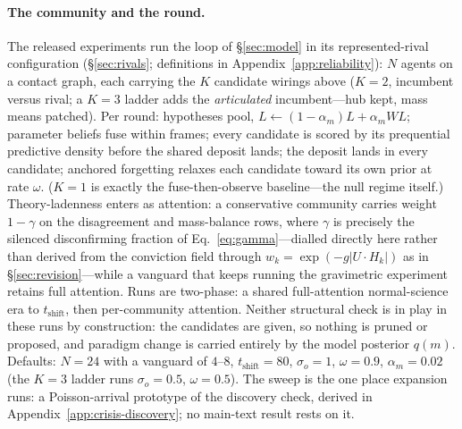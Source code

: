 \documentclass[runningheads]{llncs}
\begin{document}
\paragraph{The community and the round.}
The released experiments run the loop of \S\ref{sec:model} in its represented-rival
configuration (\S\ref{sec:rivals}; definitions in Appendix~\ref{app:reliability}): $N$
agents on a contact graph, each carrying the $K$ candidate wirings above ($K{=}2$,
incumbent versus rival; a $K{=}3$ ladder adds the \emph{articulated} incumbent---hub kept,
mass means patched). Per round: hypotheses pool,
$L\leftarrow(1-\alpha_m)L+\alpha_m WL$; parameter beliefs fuse within frames; every
candidate is scored by its prequential predictive density before the shared deposit lands;
the deposit lands in every candidate; anchored forgetting relaxes each candidate toward its
own prior at rate $\omega$. ($K{=}1$ is exactly the fuse-then-observe baseline---the null
regime itself.) Theory-ladenness enters as attention: a conservative community carries
weight $1-\gamma$ on the disagreement and mass-balance rows, where $\gamma$ is precisely
the silenced disconfirming fraction of Eq.~\eqref{eq:gamma}---dialled directly here rather
than derived from the conviction field through $w_k=\exp(-g|U\!\cdot\!H_k|)$ as in
\S\ref{sec:revision}---while a vanguard that keeps running the gravimetric experiment
retains full attention. Runs are two-phase: a shared full-attention normal-science era to
$t_{\text{shift}}$, then per-community attention. Neither structural check is in play in
these runs by construction: the candidates are given, so nothing is pruned or proposed, and
paradigm change is carried entirely by the model posterior $q(m)$. Defaults:
$N{=}24$ with a vanguard of $4$--$8$, $t_{\text{shift}}{=}80$, $\sigma_o{=}1$,
$\omega{=}0.9$, $\alpha_m{=}0.02$ (the $K{=}3$ ladder runs $\sigma_o{=}0.5$,
$\omega{=}0.5$). The sweep is the one place expansion runs: a Poisson-arrival
prototype of the discovery check, derived in Appendix~\ref{app:crisis-discovery}; no
main-text result rests on it.
\end{document}
